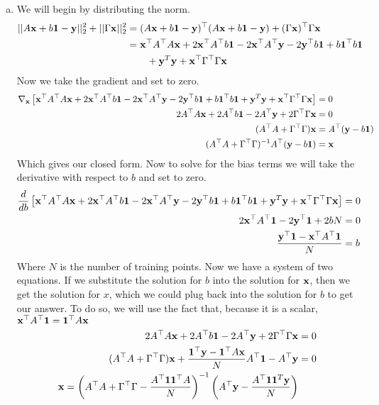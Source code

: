 \documentclass[12pt,letterpaper,fleqn]{hmcpset}
\begin{document}
\begin{enumerate}[(a)]
    \item
        We will begin by distributing the norm.
        \begin{align*}
            ||A{\bf x} + b{\bf 1} -{\bf y}||_2^2 + ||\Gamma{\bf x}||_2^2 &= (A{\bf x} + b{\bf 1} -{\bf y})^\top(A{\bf x} + b{\bf 1} -{\bf y}) + (\Gamma {\bf x})^\top \Gamma {\bf x}\\
            &= {\bf x}^\top A^\top A {\bf x} + 2 {\bf x}^\top A^\top b{\bf 1} - 2 {\bf x}^\top A^\top {\bf y} -2 {\bf y}^\top b{\bf 1} + b{\bf 1}^\top b{\bf 1} \\ &\qquad + {\bf y}^T {\bf y} + {\bf x}^\top \Gamma^\top \Gamma {\bf x}
        \end{align*}
        Now we take the gradient and set to zero.
        \begin{align*}
            \nabla_{\bf x} \left[ {\bf x}^\top A^\top A {\bf x} + 2 {\bf x}^\top A^\top b{\bf 1} - 2 {\bf x}^\top A^\top {\bf y} -2 {\bf y}^\top b{\bf 1} + b{\bf 1}^\top b{\bf 1} + {\bf y}^T {\bf y} + {\bf x}^\top \Gamma^\top \Gamma {\bf x} \right] &= 0\\
            2A^\top A {\bf x} + 2 A^\top b{\bf 1} - 2 A^\top {\bf y} + 2\Gamma^\top \Gamma {\bf x} &= 0 \\
            (A^\top A + \Gamma^\top \Gamma){\bf x} &= A^\top ({\bf y}  - b{\bf 1}) \\
            (A^\top A + \Gamma^\top \Gamma)^{-1}A^\top ({\bf y}  - b{\bf 1}) &= {\bf x}
        \end{align*}
        Which gives our closed form. Now to solve for the bias terms we will take the derivative with respect to $b$ and set to zero.
        \begin{align*}
            \frac{d}{db} \left[  {\bf x}^\top A^\top A {\bf x} + 2 {\bf x}^\top A^\top b{\bf 1} - 2 {\bf x}^\top A^\top {\bf y} -2 {\bf y}^\top b{\bf 1} + b{\bf 1}^\top b{\bf 1} + {\bf y}^T {\bf y} + {\bf x}^\top \Gamma^\top \Gamma {\bf x} \right] &= 0\\
            2 {\bf x}^\top A^\top{\bf 1} -2{\bf y}^\top{\bf 1} +2 b N &= 0 \\
             \frac{{\bf y}^\top{\bf 1} - {\bf x}^\top A^\top{\bf 1}}{N} &= b
        \end{align*}
        Where $N$ is the number of training points. Now we have a system of two equations. If we substitute the solution for $b$ into the solution for ${\bf x}$, then we get the solution for $x$, which we could plug back into the solution for $b$ to get our answer. To do so, we will use the fact that, because it is a scalar, ${\bf x}^\top A^\top{\bf 1} = {\bf 1}^\top A {\bf x}$
        \begin{align*}
            2A^\top A {\bf x} + 2 A^\top b{\bf 1} - 2 A^\top {\bf y} + 2\Gamma^\top \Gamma {\bf x} &= 0 \\
            (A^\top A + \Gamma^\top \Gamma){\bf x} + \frac{{\bf 1}^\top {\bf y} - {\bf 1}^\top A {\bf x}}{N}A^\top {\bf 1} - A^\top {\bf y}  &= 0\\
            {\bf x} =  \left(A^\top A + \Gamma^\top \Gamma -\frac{A^\top{\bf 1}{\bf 1}^\top A}{N}\right)^{-1} \left(A^\top {\bf y} - \frac{A^\top {\bf 1} {\bf 1}^T {\bf y}}{N} \right)
        \end{align*}


\end{enumerate}
\end{document}
